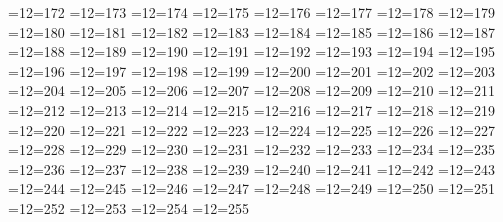 =12=172
=12=173
=12=174
=12=175
=12=176
=12=177
=12=178
=12=179
=12=180
=12=181
=12=182
=12=183
=12=184
=12=185
=12=186
=12=187
=12=188
=12=189
=12=190
=12=191
=12=192
=12=193
=12=194
=12=195
=12=196
=12=197
=12=198
=12=199
=12=200
=12=201
=12=202
=12=203
=12=204
=12=205
=12=206
=12=207
=12=208
=12=209
=12=210
=12=211
=12=212
=12=213
=12=214
=12=215
=12=216
=12=217
=12=218
=12=219
=12=220
=12=221
=12=222
=12=223
=12=224
=12=225
=12=226
=12=227
=12=228
=12=229
=12=230
=12=231
=12=232
=12=233
=12=234
=12=235
=12=236
=12=237
=12=238
=12=239
=12=240
=12=241
=12=242
=12=243
=12=244
=12=245
=12=246
=12=247
=12=248
=12=249
=12=250
=12=251
=12=252
=12=253
=12=254
=12=255
